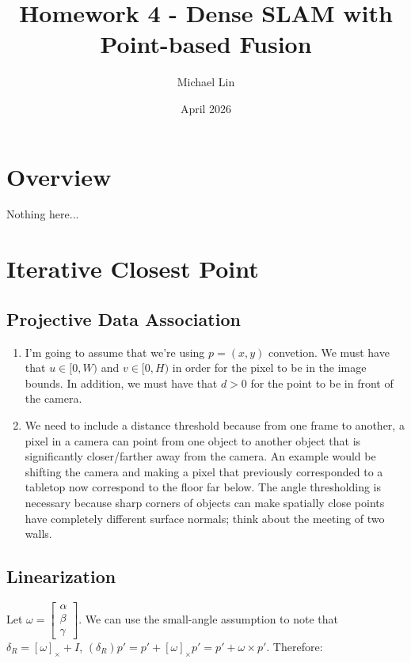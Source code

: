\documentclass{article}
\title{Homework 4 - Dense SLAM with Point-based Fusion}
\author{Michael Lin}
\date{April 2026}
\begin{document}
\maketitle

\section{Overview}
Nothing here...

\section{Iterative Closest Point}

\subsection{Projective Data Association}

\begin{enumerate}

    \item I'm going to assume that we're using $p = (x, y)$ convetion. We must have that $u \in [0, W)$ and $v \in [0, H)$ in order for the pixel to be in the image bounds. In addition, we must have that $d > 0$ for the point to be in front of the camera.

    \item We need to include a distance threshold because from one frame to another, a pixel in a camera can point from one object to another object that is significantly closer/farther away from the camera. An example would be shifting the camera and making a pixel that previously corresponded to a tabletop now correspond to the floor far below. The angle thresholding is necessary because sharp corners of objects can make spatially close points have completely different surface normals; think about the meeting of two walls.

\end{enumerate}

\subsection{Linearization}

Let $\omega = \begin{bmatrix} \alpha \\ \beta \\ \gamma \end{bmatrix}$. We can use the small-angle assumption to note that $\delta_R = [\omega]_\times + I$, $(\delta_R) p' = p' + [\omega]_\times p' = p' + \omega \times p'$. Therefore:
\end{document}
